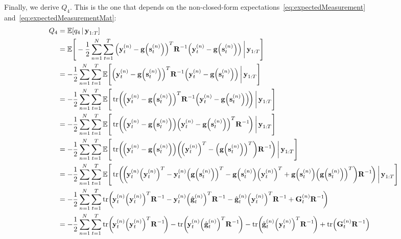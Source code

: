 	Finally, we derive \(Q_4\). This is the one that depends on the non-closed-form expectations~\eqref{eq:expectedMeasurement} and~\eqref{eq:expectedMeasurementMat}:
	\begin{align*}
		Q_4
			&= \E[q_4 \given \vec{y}_{1:T}] \\
			&= \E\Bigg[ -\frac{1}{2} \sum_{n = 1}^{N} \sum_{t = 1}^{T} \Big( \vec{y}_t^{(n)} - \vec{g}\Big(\vec{s}_t^{(n)}\Big) \Big)^T \mat{R}^{-1} \Big( \vec{y}_t^{(n)} - \vec{g}\Big(\vec{s}_t^{(n)}\Big) \Big) \bigggiven \vec{y}_{1:T} \Bigg] \\
			&= -\frac{1}{2} \sum_{n = 1}^{N} \sum_{t = 1}^{T} \E\Bigg[ \Big( \vec{y}_t^{(n)} - \vec{g}\Big(\vec{s}_t^{(n)}\Big) \Big)^T \mat{R}^{-1} \Big( \vec{y}_t^{(n)} - \vec{g}\Big(\vec{s}_t^{(n)}\Big) \Big) \bigggiven \vec{y}_{1:T} \Bigg] \\
			&= -\frac{1}{2} \sum_{n = 1}^{N} \sum_{t = 1}^{T} \E\Bigg[ \tr\!\bigg(\!\Big( \vec{y}_t^{(n)} - \vec{g}\Big(\vec{s}_t^{(n)}\Big) \Big)^T \mat{R}^{-1} \Big( \vec{y}_t^{(n)} - \vec{g}\Big(\vec{s}_t^{(n)}\Big) \Big)\!\bigg) \bigggiven \vec{y}_{1:T} \Bigg] \\
			&= -\frac{1}{2} \sum_{n = 1}^{N} \sum_{t = 1}^{T} \E\Bigg[ \tr\!\bigg(\!\Big( \vec{y}_t^{(n)} - \vec{g}\Big(\vec{s}_t^{(n)}\Big) \Big) \Big( \vec{y}_t^{(n)} - \vec{g}\Big(\vec{s}_t^{(n)}\Big) \Big)^T \mat{R}^{-1} \!\bigg) \bigggiven \vec{y}_{1:T} \Bigg] \\
			&= -\frac{1}{2} \sum_{n = 1}^{N} \sum_{t = 1}^{T} \E\Bigg[ \tr\!\bigg(\!\Big( \vec{y}_t^{(n)} - \vec{g}\Big(\vec{s}_t^{(n)}\Big) \Big) \bigg(\!\Big(\vec{y}_t^{(n)}\Big)^T - \Big(\vec{g}\Big(\vec{s}_t^{(n)}\Big)\Big)^T \bigg) \mat{R}^{-1} \!\bigg) \bigggiven \vec{y}_{1:T} \Bigg] \\
			&= -\frac{1}{2} \sum_{n = 1}^{N} \sum_{t = 1}^{T} \E\Bigg[ \tr\!\bigg(\!\bigg(\! \vec{y}_t^{(n)} \Big(\vec{y}_t^{(n)}\Big)^T - \vec{y}_t^{(n)} \Big(\vec{g}\Big(\vec{s}_t^{(n)}\Big)\Big)^T - \vec{g}\Big(\vec{s}_t^{(n)}\Big) \Big(\vec{y}_t^{(n)}\Big)^T + \vec{g}\Big(\vec{s}_t^{(n)}\Big) \Big(\vec{g}\Big(\vec{s}_t^{(n)}\Big)\Big)^T \bigg) \mat{R}^{-1} \!\bigg) \bigggiven \vec{y}_{1:T} \Bigg] \\
			&= -\frac{1}{2} \sum_{n = 1}^{N} \sum_{t = 1}^{T} \tr\!\bigg(\! \vec{y}_t^{(n)} \Big(\vec{y}_t^{(n)}\Big)^T \mat{R}^{-1} - \vec{y}_t^{(n)} \Big(\hat{\vec{g}}_t^{(n)}\Big)^T \mat{R}^{-1} - \hat{\vec{g}}_t^{(n)} \Big(\vec{y}_t^{(n)}\Big)^T \mat{R}^{-1} + \mat{G}_t^{(n)} \mat{R}^{-1} \!\bigg) \\
			&= -\frac{1}{2} \sum_{n = 1}^{N} \sum_{t = 1}^{T} \tr\!\bigg(\! \vec{y}_t^{(n)} \Big(\vec{y}_t^{(n)}\Big)^T \mat{R}^{-1} \!\bigg) - \tr\!\bigg(\! \vec{y}_t^{(n)} \Big(\hat{\vec{g}}_t^{(n)}\Big)^T \mat{R}^{-1} \!\bigg) - \tr\!\bigg(\! \hat{\vec{g}}_t^{(n)} \Big(\vec{y}_t^{(n)}\Big)^T \mat{R}^{-1} \!\bigg) + \tr\!\Big( \mat{G}_t^{(n)} \mat{R}^{-1} \Big) \\
	\end{align*}

